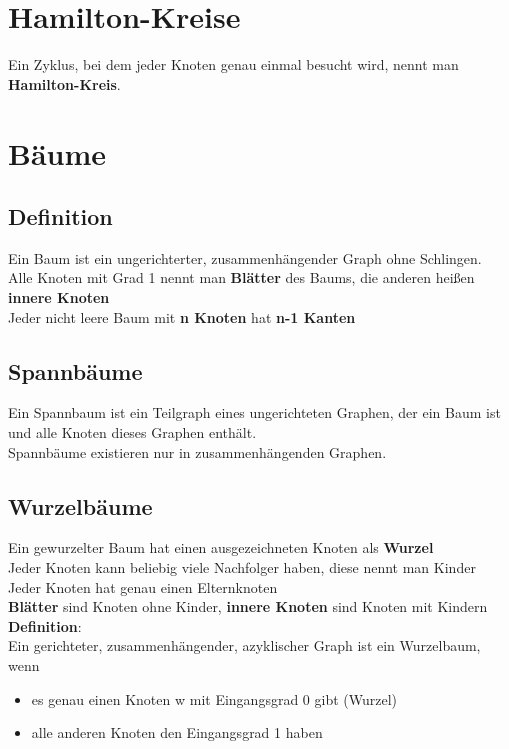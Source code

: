 \documentclass{scrreprt}
\begin{document}
\section{Hamilton-Kreise}
Ein Zyklus, bei dem jeder Knoten genau einmal besucht wird, nennt man \textbf{Hamilton-Kreis}.
\section{Bäume}
\subsection{Definition}
Ein Baum ist ein ungerichterter, zusammenhängender Graph ohne Schlingen.
\\Alle Knoten mit Grad 1 nennt man \textbf{Blätter} des Baums, die anderen heißen \textbf{innere Knoten}
\\Jeder nicht leere Baum mit \textbf{n Knoten} hat \textbf{n-1 Kanten}
\subsection{Spannbäume}
Ein Spannbaum ist ein Teilgraph eines ungerichteten Graphen, der ein Baum ist und alle Knoten dieses Graphen enthält.
\\Spannbäume existieren nur in zusammenhängenden Graphen.
\subsection{Wurzelbäume}
Ein gewurzelter Baum hat einen ausgezeichneten Knoten als \textbf{Wurzel}
\\Jeder Knoten kann beliebig viele Nachfolger haben, diese nennt man Kinder
\\Jeder Knoten hat genau einen Elternknoten
\\\textbf{Blätter} sind Knoten ohne Kinder, \textbf{innere Knoten} sind Knoten mit Kindern
\\\textbf{Definition}:\\
Ein gerichteter, zusammenhängender, azyklischer Graph ist ein Wurzelbaum, wenn
\begin{itemize}
    \item es genau einen Knoten w mit Eingangsgrad 0 gibt (Wurzel)
    \item alle anderen Knoten den Eingangsgrad 1 haben
\end{itemize}
\end{document}
